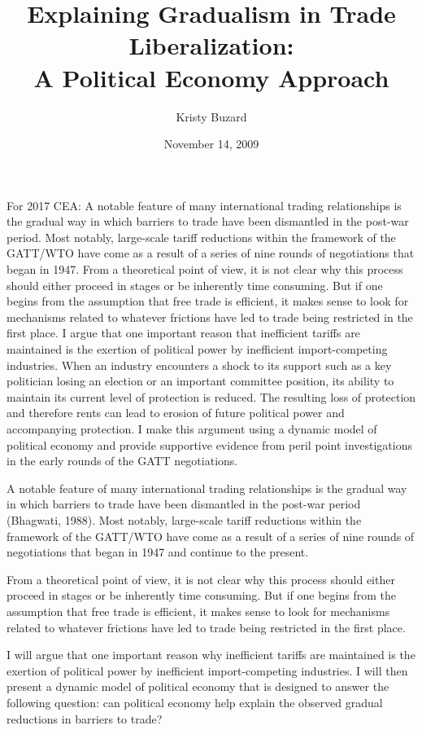 \documentclass[12pt]{article}
\begin{document}
\title{\vskip-0.6in Explaining Gradualism in Trade Liberalization: \\A Political Economy Approach}
\author{Kristy Buzard}
\date{November 14, 2009}
\maketitle

For 2017 CEA:
A notable feature of many international trading relationships is the gradual way in which barriers to trade have been dismantled in the post-war period. Most notably, large-scale tariff reductions within the framework of the GATT/WTO have come as a result of a series of nine rounds of negotiations that began in 1947. From a theoretical point of view, it is not clear why this process should either proceed in stages or be inherently time consuming. But if one begins from the assumption that free trade is efficient, it makes sense to look for mechanisms related to whatever frictions have led to trade being restricted in the first place. I argue that one important reason that inefficient tariffs are maintained is the exertion of political power by inefficient import-competing industries. When an industry encounters a shock to its support such as a key politician losing an election or an important committee position, its ability to maintain its current level of protection is reduced. The resulting loss of protection and therefore rents can lead to erosion of future political power and accompanying protection. I make this argument using a dynamic model of political economy and provide supportive evidence from peril point investigations in the early rounds of the GATT negotiations.

A notable feature of many international trading relationships is the gradual way in which barriers to trade have been dismantled in the post-war period (Bhagwati, 1988). Most notably, large-scale tariff reductions within the framework of the GATT/WTO have come as a result of a series of nine rounds of negotiations that began in 1947 and continue to the present.

From a theoretical point of view, it is not clear why this process should either proceed in stages or be inherently time consuming. But if one begins from the assumption that free trade is efficient, it makes sense to look for mechanisms related to whatever frictions have led to trade being restricted in the first place.

I will argue that one important reason why inefficient tariffs are maintained is the exertion of political power by inefficient import-competing industries. I will then present a dynamic model of political economy that is designed to answer the following question: can political economy help explain the observed gradual reductions in barriers to trade?
\end{document}

